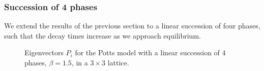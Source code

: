 \documentclass[10pt]{article}
\newcommand{\scalefig}[2]{\texttt{[image: \#2]}}
\newcommand{\defeq}{:=}
\newcommand{\zeros}{\mathbf{0}}
\newcommand{\ones}{\mathbf{1}}
\begin{document}
\subsubsection{Succession of 4 phases}
We extend the results of the previous section to a linear succession of four
phases, such that the decay times increase as we approach equilibrium.


 \begin{figure}[htb]
\caption{Eigenvectors $P_i$ for the Potts model with a linear succession of $4$ phases, $\beta=1.5$, in a $3 \times 3$ lattice.}
\label{fig:potts-succession-four-P}
\end{figure}





% 
% 
% 

\end{document}
